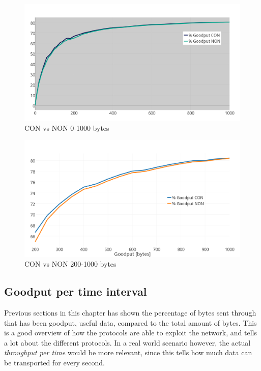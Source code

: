 \begin{figure}[ht]
    \centering
    \includegraphics[scale=1.0]{CONvsNONplot_0-k_thickerGRAY.png}    
    \caption{CON vs NON 0-1000 bytes}
    \label{fig:CONvsNON0-1000}
\end{figure}

\begin{figure}[ht]
    \centering
    \includegraphics[scale=1.0]{CONvsNON200-1000thick.png}    
    \caption{CON vs NON 200-1000 bytes}
    \label{fig:CONvsNON200-1000}
\end{figure}


\subsection{Goodput per time interval}

\noindent Previous sections in this chapter has shown the percentage of bytes sent through that has been goodput, useful data, compared to the total amount of bytes. This is a good overview of how the protocols are able to exploit the network, and tells a lot about the different protocols. In a real world scenario however, the actual \textit{throughput per time} would be more relevant, since this tells how much data can be transported for every second.

